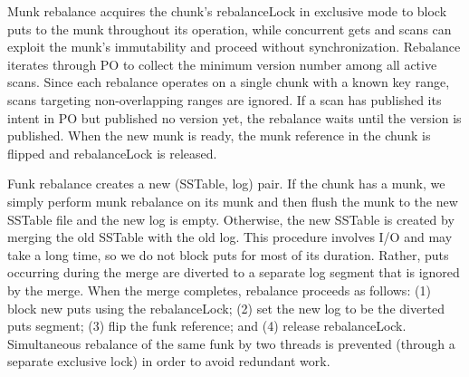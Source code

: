 \documentclass[sigplan,10pt]{acmart}
\newcommand{\remove}[1]{}
\newcommand{\sys}{EvenDB}
\begin{document}
Munk rebalance acquires the chunk's rebalanceLock in exclusive mode to 
block  puts to the munk throughout its operation, while concurrent gets and scans can exploit the munk's 
immutability and proceed without synchronization.  
%
Rebalance iterates through  PO to collect the minimum version number among all active scans. 
Since each rebalance operates on a single chunk with a known key range, scans targeting non-overlapping ranges are ignored.
If a scan has published its intent in  PO but published no version yet, the rebalance waits until the version is published. 
When the new munk is ready, the munk reference in the chunk is flipped and rebalanceLock is released.

Funk rebalance creates a new (SSTable, log) pair. 
If the chunk has a munk, we simply perform munk rebalance on its munk and then flush the munk to the new SSTable file
and the new log is empty.
Otherwise, the new SSTable is created by merging the old SSTable with the old log. 
This procedure involves I/O and may take a long time, so we do not block puts for  most of its duration. 
Rather, puts occurring during the merge are diverted to a separate log segment that is ignored by the merge.
When the merge completes, rebalance proceeds as follows:
(1) block new puts using the {rebalanceLock};
(2) set the new log to be the diverted puts segment;
(3) flip the funk reference; and (4) release {rebalanceLock}. 
Simultaneous rebalance of the same funk by two threads is prevented (through a separate exclusive lock) in order to avoid redundant work. 


\remove{
\paragraph{Splits and chunk life cycle.}

As noted above, as a result of a rebalance operation, a chunk may undergo three types of changes: munk rebalance, funk rebalance, and split. 
The latter affects the chunk object as well as the munk (if exists) and the funk.

In case of a munk rebalance, the chunk is immutable throughout the rebalance operation.
In this simple case, the chunk's state changes to \emph{asleep} (indicating that it is immutable)
when rebalance begins, and changes back to \emph{active} when rebalance ends. 
Note that the asleep state is tantamount to the rebalanceLock being held in exclusive mode.

Since funk rebalance involves I/O, it may take a long time, and so we refrain from blocking puts for its entire 
duration. In this case, the chunk becomes asleep after most of the funk is populated, and 
changes back to active after we migrate the log's new tail to the new chunk and swing the funk pointer in the chunk.
}
\end{document}
